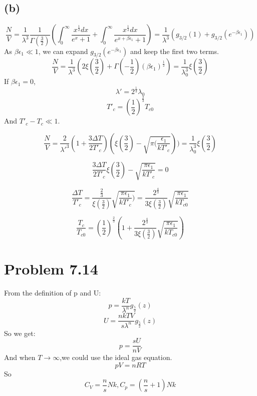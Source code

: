 \documentclass{article}
\begin{document}
\subsection*{(b)}
\begin{equation}
\frac{N}{V} = \frac{1}{\lambda^3} \frac{1}{\Gamma(\frac{3}{2})} (\int_0^{\infty} \frac{x^{\frac{1}{2}}dx}{e^x+1} + \int_0^{\infty} \frac{x^{\frac{1}{2}}dx}{e^{x+\beta \epsilon_1}+1}) = \frac{1}{\lambda^3} (g_{3/2}(1) + g_{3/2}(e^{-\beta \epsilon_1}))
\end{equation}
As $\beta \epsilon_1 \ll 1$, we can expand $g_{3/2}(e^{-\beta \epsilon_1})$ and keep the first two terms.
\begin{equation}
\frac{N}{V} = \frac{1}{\lambda^3} (2\xi(\frac{3}{2})+\Gamma(-\frac{1}{2})(\beta \epsilon_1)^{\frac{1}{2}}) = \frac{1}{\lambda_0^3} \xi(\frac{3}{2})
\end{equation}
If $\beta \epsilon_1 = 0$,
\begin{equation}
\lambda' = 2^{\frac{1}{3}} \lambda_0
\end{equation}
\begin{equation}
T'_c = (\frac{1}{2})^{\frac{2}{3}}T_{c0}
\end{equation}
And $T'_{c}-T_c \ll 1$.

\begin{equation}
\frac{N}{V} = \frac{2}{\lambda'^3} (1+\frac{3\Delta T}{2 T'_{c}}) (\xi(\frac{3}{2}) - \sqrt{\pi (\frac{\epsilon_1}{kT'_c}})) = \frac{1}{\lambda_0^3} \xi(\frac{3}{2})
\end{equation}

\begin{equation}
\frac{3\Delta T}{2 T'_{c}} \xi(\frac{3}{2}) - \sqrt{\frac{\pi \epsilon_1}{kT'_c}} =0 
\end{equation}

\begin{equation}
\frac{\Delta T}{T'_{c}} = \frac{\frac{2}{3}}{\xi(\frac{3}{2})}\sqrt{\frac{\pi \epsilon_1}{kT'_c})} =  \frac{2^{\frac{4}{3}}}{3\xi(\frac{3}{2})} \sqrt{\frac{\pi \epsilon_1}{kT_{c0}}}
\end{equation}

\begin{equation}
\frac{T_c}{T_{c0}} = (\frac{1}{2})^{\frac{2}{3}} (1+\frac{2^{\frac{4}{3}}}{3\xi(\frac{3}{2})} \sqrt{\frac{\pi \epsilon_1}{kT_{c0}}})
\end{equation}


\section*{Problem 7.14}
From the definition of p and U:
$$p=\frac{kT}{\lambda ^n}g_{\frac{5}{2}}(z)$$
$$U=\frac{nkTV}{s\lambda ^n}g_{\frac{5}{2}}(z)$$
So we get:
$$p=\frac{sU}{nV}$$
And when $T\rightarrow\infty$,we could use the ideal gas equation.
$$pV=nRT$$
So
$$C_V=\frac{n}{s}Nk,C_p=(\frac{n}{s}+1)Nk$$
\end{document}
